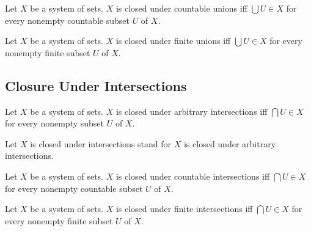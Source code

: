 \documentclass[10pt]{article}
\begin{document}
  \begin{forthel}
    \begin{definition}
      Let $X$ be a system of sets.
      $X$ is closed under countable unions iff $\bigcup U \in X$ for every
      nonempty countable subset $U$ of $ X$.
    \end{definition}
  \end{forthel}

  \begin{forthel}
    \begin{definition}
      Let $X$ be a system of sets.
      $X$ is closed under finite unions iff $\bigcup U \in X$ for every nonempty
      finite subset $U$ of $X$.
    \end{definition}
  \end{forthel}


  \subsection{Closure Under Intersections}

  \begin{forthel}
    \begin{definition}
      Let $X$ be a system of sets.
      $X$ is closed under arbitrary intersections iff $\bigcap U \in X$ for
      every nonempty subset $U$ of $X$.
    \end{definition}

    Let $X$ is closed under intersections stand for $X$ is closed under
    arbitrary intersections.
  \end{forthel}

  \begin{forthel}
    \begin{definition}
      Let $X$ be a system of sets.
      $X$ is closed under countable intersections iff $\bigcap U \in X$ for
      every nonempty countable subset $U$ of $X$.
    \end{definition}
  \end{forthel}

  \begin{forthel}
    \begin{definition}
      Let $X$ be a system of sets.
      $X$ is closed under finite intersections iff $\bigcap U \in X$ for every
      nonempty finite subset $U$ of $X$.
    \end{definition}
  \end{forthel}
\end{document}
